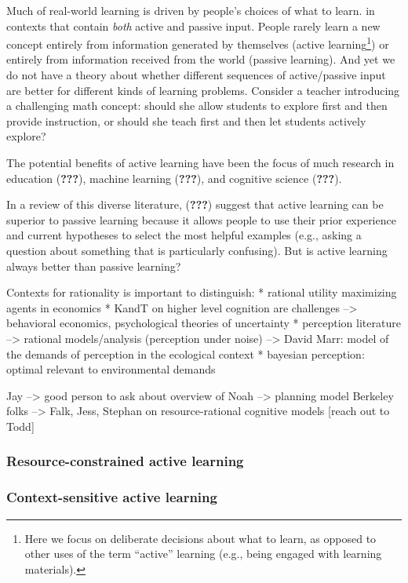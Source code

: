 \documentclass[a4paper,man,apacite,floatsintext]{apa6}
\begin{document}
Much of real-world learning is driven by people's choices of what to
learn. in contexts that contain \emph{both} active and passive input.
People rarely learn a new concept entirely from information generated by
themselves (active learning\footnote{Here we focus on deliberate
  decisions about what to learn, as opposed to other uses of the term
  ``active'' learning (e.g., being engaged with learning materials).})
or entirely from information received from the world (passive learning).
And yet we do not have a theory about whether different sequences of
active/passive input are better for different kinds of learning
problems. Consider a teacher introducing a challenging math concept:
should she allow students to explore first and then provide instruction,
or should she teach first and then let students actively explore?

The potential benefits of active learning have been the focus of much
research in education ({\textbf{???}}), machine learning
({\textbf{???}}), and cognitive science ({\textbf{???}}).

In a review of this diverse literature, ({\textbf{???}}) suggest that
active learning can be superior to passive learning because it allows
people to use their prior experience and current hypotheses to select
the most helpful examples (e.g., asking a question about something that
is particularly confusing). But is active learning always better than
passive learning?

Contexts for rationality is important to distinguish: * rational utility
maximizing agents in economics * KandT on higher level cognition are
challenges --\textgreater{} behavioral economics, psychological theories
of uncertainty * perception literature --\textgreater{} rational
models/analysis (perception under noise) --\textgreater{} David Marr:
model of the demands of perception in the ecological context * bayesian
perception: optimal relevant to environmental demands

Jay --\textgreater{} good person to ask about overview of Noah
--\textgreater{} planning model Berkeley folks --\textgreater{} Falk,
Jess, Stephan on resource-rational cognitive models {[}reach out to
Todd{]}

\subsubsection{Resource-constrained active
learning}\label{resource-constrained-active-learning}

\subsubsection{Context-sensitive active
learning}\label{context-sensitive-active-learning}
\end{document}
